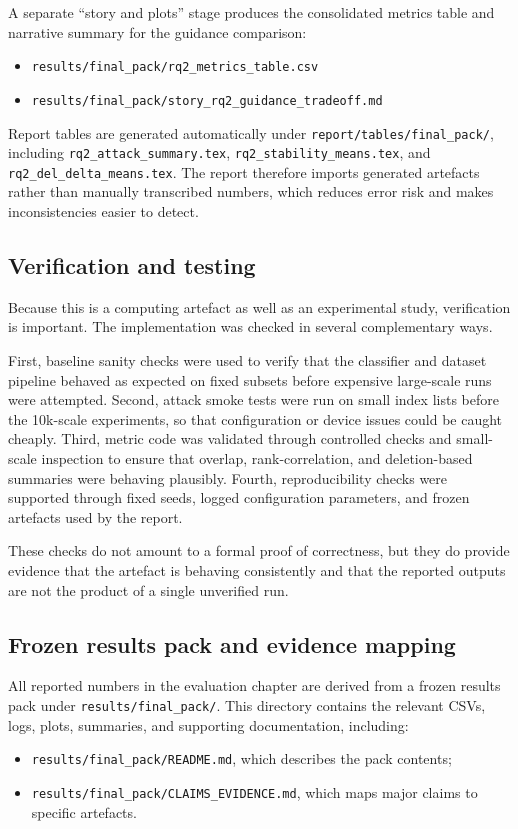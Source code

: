A separate ``story and plots'' stage produces the consolidated metrics table and narrative
summary for the guidance comparison:
\begin{itemize}
  \item \texttt{results/final\_pack/rq2\_metrics\_table.csv}
  \item \texttt{results/final\_pack/story\_rq2\_guidance\_tradeoff.md}
\end{itemize}

Report tables are generated automatically under \texttt{report/tables/final\_pack/}, including
\texttt{rq2\_attack\_summary.tex}, \texttt{rq2\_stability\_means.tex}, and
\texttt{rq2\_del\_delta\_means.tex}. The report therefore imports generated artefacts rather
than manually transcribed numbers, which reduces error risk and makes inconsistencies easier to
detect.

\subsection{Verification and testing}
Because this is a computing artefact as well as an experimental study, verification is
important. The implementation was checked in several complementary ways.

First, baseline sanity checks were used to verify that the classifier and dataset pipeline
behaved as expected on fixed subsets before expensive large-scale runs were attempted. Second,
attack smoke tests were run on small index lists before the 10k-scale experiments, so that
configuration or device issues could be caught cheaply. Third, metric code was validated
through controlled checks and small-scale inspection to ensure that overlap, rank-correlation,
and deletion-based summaries were behaving plausibly. Fourth, reproducibility checks were
supported through fixed seeds, logged configuration parameters, and frozen artefacts used by the
report.

These checks do not amount to a formal proof of correctness, but they do provide evidence that
the artefact is behaving consistently and that the reported outputs are not the product of a
single unverified run.

\subsection{Frozen results pack and evidence mapping}
All reported numbers in the evaluation chapter are derived from a frozen results pack under
\texttt{results/final\_pack/}. This directory contains the relevant CSVs, logs, plots,
summaries, and supporting documentation, including:
\begin{itemize}
  \item \texttt{results/final\_pack/README.md}, which describes the pack contents;
  \item \texttt{results/final\_pack/CLAIMS\_EVIDENCE.md}, which maps major claims to specific
  artefacts.
\end{itemize}

